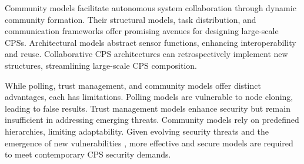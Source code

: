 Community models facilitate autonomous system collaboration through dynamic community formation. Their structural models, task distribution, and communication frameworks offer promising avenues for designing large-scale CPSs. Architectural models abstract sensor functions, enhancing interoperability and reuse. Collaborative CPS architectures can retrospectively implement new structures, streamlining large-scale CPS composition.

While polling, trust management, and community models offer distinct advantages, each has limitations. Polling models are vulnerable to node cloning, leading to false results. Trust management models enhance security but remain insufficient in addressing emerging threats. Community models rely on predefined hierarchies, limiting adaptability. Given evolving security threats \cite{Nur2016,Miao2017} and the emergence of new vulnerabilities \cite{Mitchell2016,Lu2016}, more effective and secure models are required to meet contemporary CPS security demands.
